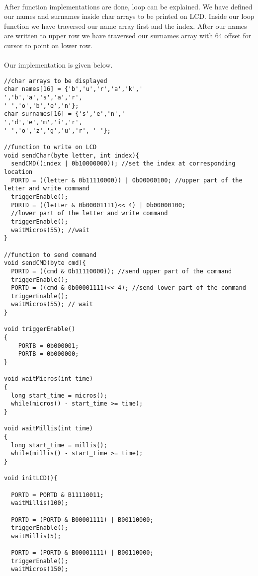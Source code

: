 \documentclass[pdftex,12pt,a4paper]{article}
\begin{document}
\begin{flushleft}
\paragraph{}
After function implementations are done, loop can be explained. We have defined our names and surnames inside char arrays to be printed on LCD. Inside our loop function we have traversed our name array first and the index. After our names are written to upper row we have traversed our surnames array with 64 offset for cursor to point on lower row.
\paragraph{}
Our implementation is given below.

\begin{lstlisting}[language=Arduino]
//char arrays to be displayed
char names[16] = {'b','u','r','a','k',' 
','b','a','s','a','r',
' ','o','b','e','n'};
char surnames[16] = {'s','e','n',' 
','d','e','m','i','r',
' ','o','z','g','u','r', ' '};

//function to write on LCD
void sendChar(byte letter, int index){
  sendCMD((index | 0b10000000)); //set the index at corresponding location
  PORTD = ((letter & 0b11110000)) | 0b00000100; //upper part of the letter and write command
  triggerEnable();
  PORTD = ((letter & 0b00001111)<< 4) | 0b00000100; 
  //lower part of the letter and write command
  triggerEnable();
  waitMicros(55); //wait
}

//function to send command
void sendCMD(byte cmd){
  PORTD = ((cmd & 0b11110000)); //send upper part of the command
  triggerEnable();
  PORTD = ((cmd & 0b00001111)<< 4); //send lower part of the command
  triggerEnable();
  waitMicros(55); // wait
}

void triggerEnable()
{
	PORTB = 0b000001;
  	PORTB = 0b000000;
}

void waitMicros(int time)
{
  long start_time = micros();
  while(micros() - start_time >= time);
}

void waitMillis(int time)
{
  long start_time = millis();
  while(millis() - start_time >= time);
}

void initLCD(){

  PORTD = PORTD & B11110011;
  waitMillis(100);

  PORTD = (PORTD & B00001111) | B00110000;
  triggerEnable();
  waitMillis(5);

  PORTD = (PORTD & B00001111) | B00110000;
  triggerEnable();
  waitMicros(150);


\end{lstlisting}
\end{flushleft}
\end{document}
